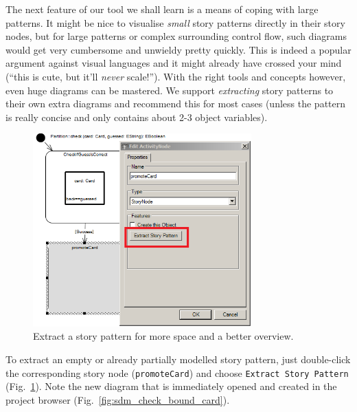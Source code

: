 The next feature of our tool we shall learn is a means of coping with large
patterns.  It might be nice to visualise \emph{small} story patterns directly in
their story nodes, but for large patterns or complex surrounding control flow,
such diagrams would get very cumbersome and unwieldy pretty quickly.  This is
indeed a popular argument against visual languages and it might already have
crossed your mind (``this is cute, but it'll \emph{never} scale!'').  With the
right tools and concepts however, even huge diagrams can be mastered.  We
support \emph{extracting} story patterns to their own extra diagrams and
recommend this for most cases (unless the pattern is really concise and
only contains about 2-3 object variables).  

\begin{figure}[htbp]
\begin{center}
  \includegraphics[width=0.75\textwidth]{pics/sdmBilder/check/sdm21}
  \caption{Extract a story pattern for more space and a better overview.}  
  \label{fig:sdm_check_extract_storypattern}
\end{center}
\end{figure}

To extract an empty or already
partially modelled story pattern, just double-click the corresponding story node
(\texttt{promoteCard}) and choose \texttt{Extract Story Pattern}
(Fig.~\ref{fig:sdm_check_extract_storypattern}). Note the new diagram that is
immediately opened and created in the project browser
(Fig.~\ref{fig:sdm_check_bound_card}).

